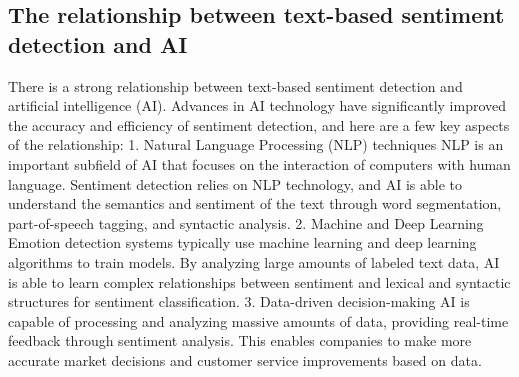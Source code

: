 \documentclass[journal]{IEEEtran}
\begin{document}
\subsection{The relationship between text-based sentiment detection and AI}
There is a strong relationship between text-based sentiment detection and artificial intelligence (AI). Advances in AI technology have significantly improved the accuracy and efficiency of sentiment detection, and here are a few key aspects of the relationship: 1. Natural Language Processing (NLP) techniques
NLP is an important subfield of AI that focuses on the interaction of computers with human language. Sentiment detection relies on NLP technology, and AI is able to understand the semantics and sentiment of the text through word segmentation, part-of-speech tagging, and syntactic analysis.
2. Machine and Deep Learning
Emotion detection systems typically use machine learning and deep learning algorithms to train models. By analyzing large amounts of labeled text data, AI is able to learn complex relationships between sentiment and lexical and syntactic structures for sentiment classification.
3. Data-driven decision-making
AI is capable of processing and analyzing massive amounts of data, providing real-time feedback through sentiment analysis. This enables companies to make more accurate market decisions and customer service improvements based on data.
\end{document}
